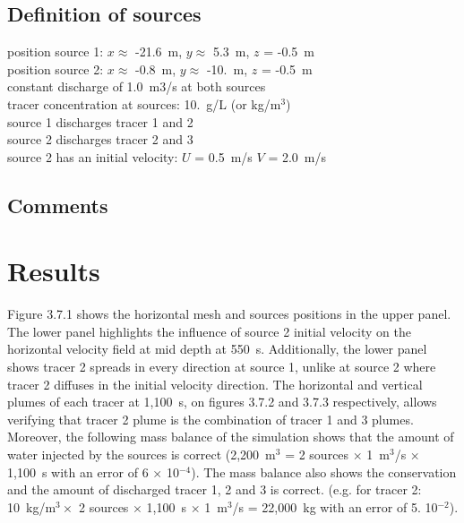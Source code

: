\subsection{Definition of sources}
%
position source 1: $x \approx$ -21.6~m, $y \approx$ 5.3~m, $z$ = -0.5~m\\
position source 2: $x \approx$ -0.8~m, $y \approx$ -10.~m, $z$ = -0.5~m\\
constant discharge of 1.0~m3/s at both sources\\
tracer concentration at sources: 10.~g/L (or kg/m$^3$)\\
source 1 discharges tracer 1 and 2\\
source 2 discharges tracer 2 and 3\\
source 2 has an initial velocity: $U$ = 0.5~m/s $V$ = 2.0~m/s
%
\subsection{Comments}
%
%
%
\section{Results}
%
Figure 3.7.1 shows the horizontal mesh and sources positions in the
upper panel.
The lower panel highlights the influence of source 2 initial velocity
on the horizontal velocity field at mid depth at 550~s.
Additionally, the lower panel shows tracer 2 spreads in every direction
at source 1, unlike at source 2 where tracer 2 diffuses in the initial
velocity direction.
The horizontal and vertical plumes of each tracer at 1,100~s, on
figures 3.7.2 and 3.7.3 respectively, allows verifying that tracer 2
plume is the combination of tracer 1 and 3 plumes.
Moreover, the following mass balance of the  simulation
shows that the amount of water injected by the sources is correct
(2,200~m$^3$ = 2 sources $\times$ 1~m$^3$/s $\times$ 1,100~s
with an error of 6 $\times$ 10$^{-4}$).
The mass balance also shows the conservation and the amount of
discharged tracer 1, 2 and 3 is correct.
(e.g. for tracer 2: 10~kg/m$^3 \times$ 2 sources $\times$ 1,100~s
$\times$ 1~m$^3$/s = 22,000~kg with an error of 5. 10$^{-2}$).

